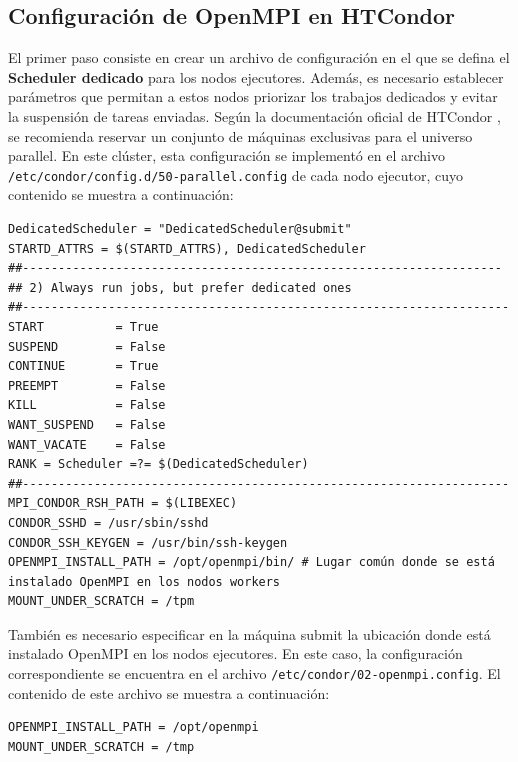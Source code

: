 \FloatBarrier\subsection{Configuración de OpenMPI en HTCondor}

El primer paso consiste en crear un archivo de configuración en el que se defina el \textbf{Scheduler dedicado} para los nodos ejecutores. Además, es necesario establecer parámetros que permitan a estos nodos priorizar los trabajos dedicados y evitar la suspensión de tareas enviadas. Según la documentación oficial de HTCondor \cite{HTCondor_Parallel}, se recomienda reservar un conjunto de máquinas exclusivas para el universo parallel. En este clúster, esta configuración se implementó en el archivo \texttt{/etc/condor/config.d/50-parallel.config} de cada nodo ejecutor, cuyo contenido se muestra a continuación:


\begin{verbatim}
DedicatedScheduler = "DedicatedScheduler@submit"
STARTD_ATTRS = $(STARTD_ATTRS), DedicatedScheduler
##-------------------------------------------------------------------
## 2) Always run jobs, but prefer dedicated ones
##--------------------------------------------------------------------
START          = True
SUSPEND        = False
CONTINUE       = True
PREEMPT        = False
KILL           = False
WANT_SUSPEND   = False
WANT_VACATE    = False
RANK = Scheduler =?= $(DedicatedScheduler) 
##--------------------------------------------------------------------
MPI_CONDOR_RSH_PATH = $(LIBEXEC)
CONDOR_SSHD = /usr/sbin/sshd
CONDOR_SSH_KEYGEN = /usr/bin/ssh-keygen
OPENMPI_INSTALL_PATH = /opt/openmpi/bin/ # Lugar común donde se está instalado OpenMPI en los nodos workers
MOUNT_UNDER_SCRATCH = /tpm
\end{verbatim}

También es necesario especificar en la máquina submit la ubicación donde está instalado OpenMPI en los nodos ejecutores. En este caso, la configuración correspondiente se encuentra en el archivo \texttt{/etc/condor/02-openmpi.config}. El contenido de este archivo se muestra a continuación:

\begin{verbatim}
OPENMPI_INSTALL_PATH = /opt/openmpi
MOUNT_UNDER_SCRATCH = /tmp
\end{verbatim}

